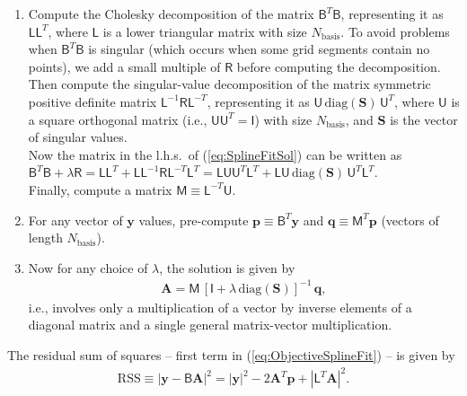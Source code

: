 \documentclass[12pt]{article}
\newcommand{\bA}{\boldsymbol{A}}
\newcommand{\by}{\boldsymbol{y}}
\begin{document}
\begin{enumerate}
\item Compute the Cholesky decomposition of the matrix $\mathsf{B}^T\mathsf{B}$, representing it as $\mathsf{L}\mathsf{L}^T$, where $\mathsf{L}$ is a lower triangular matrix with size $N_\mathrm{basis}$. To avoid problems when $\mathsf{B}^T\mathsf{B}$ is singular (which occurs when some grid segments contain no points), we add a small multiple of $\mathsf{R}$ before computing the decomposition.\\
Then compute the singular-value decomposition of the matrix symmetric positive definite matrix $\mathsf{L}^{-1} \mathsf{R} \mathsf{L}^{-T}$, representing it as $\mathsf{U}\, \mathrm{diag}(\boldsymbol{S})\, \mathsf{U}^T$, where $\mathsf{U}$ is a square orthogonal matrix (i.e., $\mathsf{U}\mathsf{U}^T=\mathsf{I}$) with size $N_\mathrm{basis}$, and $\boldsymbol{S}$ is the vector of singular values.\\
Now the matrix in the l.h.s.\ of (\ref{eq:SplineFitSol}) can be written as\\
$\mathsf{B}^T\mathsf{B}+\lambda \mathsf{R} = \mathsf{L} \mathsf{L}^T + \mathsf{L} \mathsf{L}^{-1} \mathsf{R} \mathsf{L}^{-T} \mathsf{L}^T = \mathsf{L} \mathsf{U} \mathsf{U}^T \mathsf{L}^T + \mathsf{L} \mathsf{U}\, \mathrm{diag}(\boldsymbol{S})\, \mathsf{U}^T \mathsf{L}^T$.\\
Finally, compute a matrix $\mathsf{M}\equiv \mathsf{L}^{-T}\mathsf{U}$.
\item For any vector of $\by$ values, pre-compute $\boldsymbol{p}\equiv \mathsf{B}^T\by$ and $\boldsymbol{q}\equiv \mathsf{M}^T\boldsymbol{p}$ (vectors of length $N_\mathrm{basis}$).
\item Now for any choice of $\lambda$, the solution is given by
\begin{align}
\bA = \mathsf{M}\, [\mathsf{I}+\lambda\,\mathrm{diag}(\boldsymbol{S})]^{-1}\,\boldsymbol{q},
\end{align}
i.e., involves only a multiplication of a vector by inverse elements of a diagonal matrix and a single general matrix-vector multiplication.
\end{enumerate}

The residual sum of squares -- first term in (\ref{eq:ObjectiveSplineFit}) -- is given by
\begin{align}
\mathrm{RSS} \equiv |\by - \mathsf{B}\bA|^2 = |\by|^2 - 2\bA^T\boldsymbol{p} + |\mathsf{L}^T\bA|^2.
\end{align}
\end{document}
